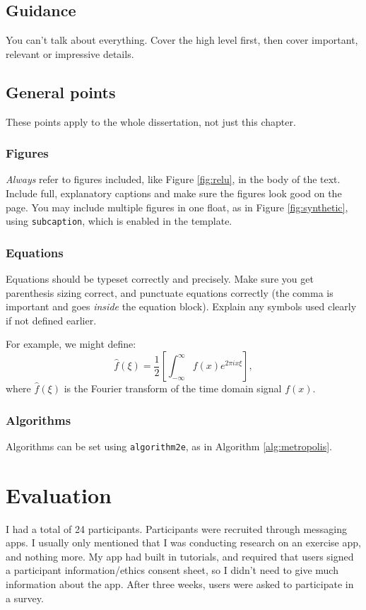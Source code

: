 \documentclass{l4proj}
\begin{document}
\section{Guidance}
You can't talk about everything. Cover the high level first, then cover important, relevant or impressive details.


\section{General points}
These points apply to the whole dissertation, not just this chapter.


\subsection{Figures}
\emph{Always} refer to figures included, like Figure \ref{fig:relu}, in the body of the text. Include full, explanatory captions and make sure the figures look good on the page.
You may include multiple figures in one float, as in Figure \ref{fig:synthetic}, using \texttt{subcaption}, which is enabled in the template.


\subsection{Equations}

Equations should be typeset correctly and precisely. Make sure you get parenthesis sizing correct, and punctuate equations correctly 
(the comma is important and goes \textit{inside} the equation block). Explain any symbols used clearly if not defined earlier. 

For example, we might define:
\begin{equation}
    \hat{f}(\xi) = \frac{1}{2}\left[ \int_{-\infty}^{\infty} f(x) e^{2\pi i x \xi} \right],
\end{equation}    
where $\hat{f}(\xi)$ is the Fourier transform of the time domain signal $f(x)$.

\subsection{Algorithms}
Algorithms can be set using \texttt{algorithm2e}, as in Algorithm \ref{alg:metropolis}.

\chapter{Evaluation} 


I had a total of 24 participants. Participants were recruited through messaging apps. I usually only mentioned that I was conducting research on an exercise app, and nothing more. My app had built in tutorials, and required that users signed a participant information/ethics consent sheet, so I didn't need to give much information about the app. After three weeks, users were asked to participate in a survey.
\end{document}
